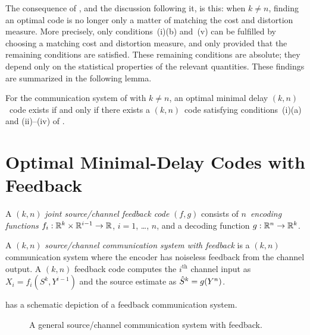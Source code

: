 The consequence of , and the discussion following it, is this:
when $k \ne n$, finding an optimal code is no longer only a matter of matching
the cost and distortion measure. More precisely, only conditions~(i)(b) and~(v)
can be fulfilled by choosing a matching cost and distortion measure, and only
provided that the remaining conditions are satisfied. These remaining conditions
are absolute; they depend only on the statistical properties of the relevant
quantities. These findings are summarized in the following lemma.

\begin{lemma}
  \label{lem:optcodenkexist}
  For the communication system of  with $k \ne n$, an
  optimal minimal delay $(k,n)$~code exists if and only if there exists a
  $(k,n)$~code satisfying conditions~(i)(a) and (ii)--(iv) of .
\end{lemma}


\section{Optimal Minimal-Delay Codes with Feedback}
\label{sec:optmindelfb}

\begin{definition}
  \label{def:fbcode}
  A $(k,n)$ \emph{joint source/channel feedback code} $(f,g)$ consists of
  $n$~\emph{encoding functions} $f_i : \mathbb{R}^k \times \mathbb{R}^{i-1} \rightarrow \mathbb{R}$, $i = 1$,
  \dots, $n$, and a decoding function $g: \mathbb{R}^n \rightarrow \mathbb{R}^k$. 
\end{definition}

\begin{definition}
  \label{def:fbcommsys}
  A $(k,n)$ \emph{source/channel communication system with feedback} is a
  $(k,n)$ communication system where the encoder has noiseless feedback from the
  channel output. A $(k,n)$ feedback code computes the $i^{\text{th}}$ channel
  input as $X_i = f_i(S^k, Y^{i-1})$ and the source estimate as ${\hat{S}}^k =
  g(Y^n)$. 
\end{definition}

 has a schematic depiction of a feedback communication system.
\begin{figure}[tbp]
  \begin{center}
  \end{center}
  \caption{A general source/channel communication system with feedback.}
  \label{fig:fbcommsys}
\end{figure}

